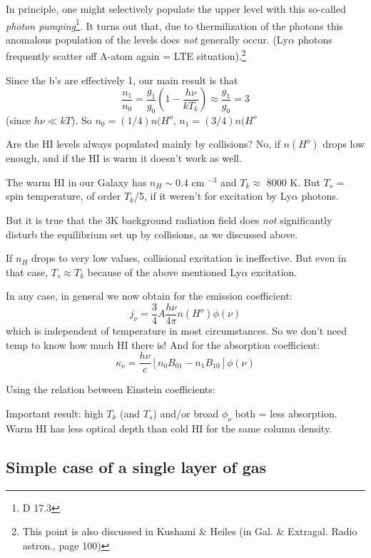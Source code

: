 \documentclass[12pt]{article}
\newcommand{\mar}[1]{\hspace{0pt}\marginpar{-\textcolor{black}{#1}-}}
\newcommand{\mynotes}[1]{\textcolor{mygreen}{#1}}
\begin{document}
In principle, one might selectively populate the upper level with this
so-called \textit{photon pumping}\footnote{D 17.3}.
It turns out that, due to thermilization of the photons this anomalous
population of the levels does \emph{not} generally occur. (Ly$\alpha$ photons
frequently scatter off A-atom again = LTE situation).\footnote{
    This point is also discussed in Kushami \& Heiles (in Gal. \&
    Extragal. Radio astron., page 100)}

\mar{37}Since the b's are effectively 1, our \textcolor{bred}{main result}
is that
\[
    \frac{n_{1}}{n_{0}}
    = \frac{g_{1}}{g_{0}} \left( 1 - \frac{h\nu}{kT_{k}} \right)
    \approx \frac{g_{1}}{g_{0}} = 3
    \]
(since $h\nu \ll kT$). So $n_{0} = (1/4)n(H^{o}$, $n_{1} = (3/4)n(H^{o}$

Are the HI levels always populated mainly by collisions? No, if $n(H^{o})$ drops
low enough, and if the HI is warm it doesn't work as well.

The warm HI in our Galaxy has $n_{H}\sim0.4$ cm $^{-3}$ and $T_{k} \approx$ 8000 K.
But $T_{s}$ = spin temperature, of order $T_{k}$/5, if it weren't for
excitation by Ly$\alpha$ photons.

But it is true that the 3K background radiation field does \emph{not}
significantly disturb the equilibrium set up by collisions, as we
discussed above.

If $n_{H}$ drops to very low values, collisional excitation is ineffective.
But even in that case, $T_{s} \approx T_{k}$ because of the above mentioned
Ly$\alpha$ excitation.

In any case, in general we now obtain for the emission coefficient:
\[
    j_{\nu} = \frac{3}{4} A \frac{h\nu}{4\pi} n(H^{o}) \phi(\nu)
    \]
which is independent of temperature in most circumstances.
\mynotes{So we don't need temp to know how much HI there is!}
And for the absorption coefficient:
\[
    \kappa_{\nu} = \frac{h\nu}{c} \left[
        n_{0}B_{01} - n_{1}B_{10} \right]
        \phi(\nu)
    \]

\mar{38}
Using the relation between Einstein coefficients:

\textcolor{bred}{Important result:} high $T_{k}$ (and $T_{s}$) and/or
broad $\phi_{\nu}$ both = less absorption. \mynotes{Warm HI has less optical
depth than cold HI for the same column density.}

\subsection{Simple case of a single layer of gas}
\end{document}
